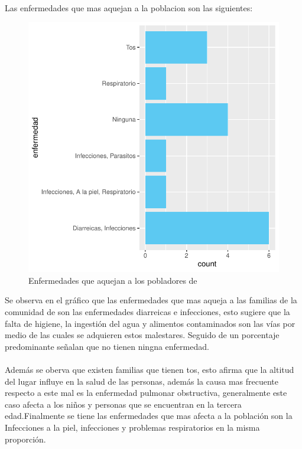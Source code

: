 \documentclass[12pt]{article}\usepackage[]{graphicx}\usepackage[]{xcolor}
\makeatletter
\def\maxwidth{ %
  \ifdim\Gin@nat@width>\linewidth
    \linewidth
  \else
    \Gin@nat@width
  \fi
}
\newenvironment{knitrout}{}{} %
\makeatother
\begin{document}
	\\
	Las enfermedades que mas aquejan a la poblacion son las siguientes:
	\begin{figure}[H]
	\centering
\begin{knitrout}
\color{fgcolor}
\includegraphics[width=\maxwidth]{figure/nueve-1} 
\end{knitrout}
	\caption{Enfermedades que aquejan a los pobladores de \comunidad}
	\end{figure}
	Se observa en el gráfico que las enfermedades que mas aqueja a las familias de la comunidad de \comunidad son las enfermedades diarreicas e infecciones, esto sugiere que la falta de higiene, la ingestión del agua y alimentos contaminados son las vías por medio de las cuales se adquieren estos malestares. Seguido de un porcentaje predominante señalan que no tienen ningna enfermedad.\\
	\\
	Además se oberva que existen familias que tienen tos, esto afirma que la altitud del lugar influye en la salud de las personas, además la causa mas frecuente respecto a este mal es la enfermedad pulmonar obstructiva, generalmente este caso afecta a los niños y personas que se encuentran en la tercera edad.Finalmente se tiene las enfermedades que mas afecta a la población son la Infecciones a la piel, infecciones y problemas respiratorios en la misma proporción.\\
\end{document}
